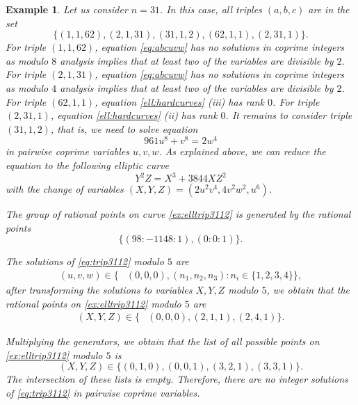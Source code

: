 \documentclass[a4paper,12pt,english,reqno]{amsart}
\newtheorem{exam}{Example}
\begin{document}
\begin{exam}
Let us consider $n=31$. In this case, all triples $(a,b,c)$ are in the set $$
\{(1,1,62),(2,1,31),(31,1,2),(62,1,1),(2,31,1) \}.
$$
For triple $(1,1,62)$, equation \eqref{eq:abcuvw} has no solutions in coprime integers as modulo $8$ analysis implies that at least two of the variables are divisible by $2$. For triple $(2,1,31)$, equation \eqref{eq:abcuvw} has no solutions in coprime integers as modulo $4$ analysis implies that at least two of the variables are divisible by $2$.  For triple $(62,1,1)$, equation \eqref{ell:hardcurves} (iii) has rank $0$. For triple $(2,31,1)$, equation \eqref{ell:hardcurves} (ii) has rank $0$. It remains to consider triple $(31,1,2)$, that is, we need to solve equation 
\begin{equation}\label{eq:trip3112}
961u^8+v^8=2 w^4
\end{equation}
in pairwise coprime variables $u,v,w$. As explained above, we can reduce the equation to the following elliptic curve
\begin{equation}\label{ex:elltrip3112}
Y^2Z=X^3+3844XZ^2
\end{equation}
with the change of variables $(X,Y,Z)=\left(2u^2v^4,4v^2w^2,u^6\right)$.

The group of rational points on curve \eqref{ex:elltrip3112} is generated by the rational points $$\{(98:-1148:1),(0:0:1)\}.$$ %

The solutions of \eqref{eq:trip3112} modulo $5$ are 
$$
\begin{aligned}
(u,v,w)\in \{ & (0,0,0),(n_1,n_2,n_3): n_i \in \{1,2,3,4\}\},
\end{aligned}
$$
after transforming the solutions to variables $X,Y,Z$ modulo $5$, we obtain that the rational points on \eqref{ex:elltrip3112} modulo $5$ are
$$
\begin{aligned}
(X,Y,Z)\in \{ & (0,0,0),(2,1,1),(2,4,1)\}.
\end{aligned}
$$

Multiplying the generators, we obtain that the list of all possible points on \eqref{ex:elltrip3112} modulo $5$ is
$$
(X,Y,Z) \in \{(0,1,0),(0,0,1),(3,2,1),(3,3,1) \}.
$$
The intersection of these lists is empty. Therefore, there are no integer solutions of \eqref{eq:trip3112} in pairwise coprime variables.
\end{exam}
\end{document}
